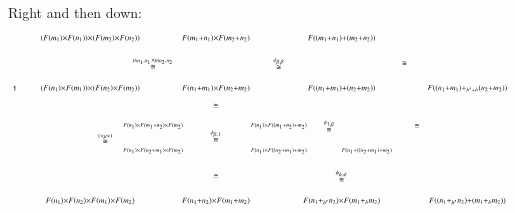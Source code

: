 \documentclass[reqno]{amsart}
\begin{document}
Right and then down:
\[
\begin{tikzpicture}[scale=1.6]
\node () at (5.75,2.25) {$\scriptstyle\stackrel{\mu_{m_1,n_1} \times \mu_{m_2,n_2}}{\cong}$};
\node () at (8.25,2.25) {$\scriptstyle\stackrel{\phi_{\beta,\beta}}{\cong}$};
\node () at (10.75,2.25) {$\scriptstyle{\cong}$};
\node () at (4.8,0.75) {$\scriptstyle\stackrel{1 \times \mu \times 1}{\cong}$};
\node () at (7,1.4) {$\scriptstyle{\cong}$};
\node () at (7,0.8) {$\scriptstyle\stackrel{\phi_{\beta,1}}{\cong}$};
\node () at (7,0) {$\scriptstyle{\cong}$};
\node () at (9.5,0) {$\scriptstyle\stackrel{\phi_{\psi,\psi}}{\cong}$};
\node () at (9.25,1) {$\scriptstyle\stackrel{\phi_{1,\beta}}{\cong}$};
\node () at (11,1) {$\scriptstyle{\cong}$};
\node (D) at (3,1.75) {$\scriptstyle{\one}$};
\node (E) at (7,-0.5) {$\scriptstyle{F(n_1+n_2) \times F(m_1+m_2)}$};
\node (E') at (9.5,-0.5) {$\scriptstyle{F(n_1+_{b'} n_2) \times F(m_1+_{b}m_2)}$};
\node (E'') at (12,-0.5) {$\scriptstyle{F((n_1+_{b'} n_2)+(m_1+_{b}m_2))}$};
\node (C) at (7,1.75) {$\scriptstyle{F(n_1+m_1) \times F(n_2+m_2)}$};
\node (A) at (9.5,1.75) {$\scriptstyle{F((n_1+m_1)+(n_2+m_2))}$};
\node (A') at (12,1.75) {$\scriptstyle{F((n_1+m_1)+_{b'+b} (n_2+m_2))}$};
\node (G) at (4.5,1.75) {$\scriptstyle{(F(n_1) \times F(m_1)) \times (F(n_2) \times F(m_2))}$};
\node (G') at (4.5,-0.5) {$\scriptstyle{F(n_1) \times F(n_2) \times F(m_1) \times F(m_2)}$};
\node (G'') at (4.5,2.75) {$\scriptstyle{(F(m_1) \times F(n_1)) \times (F(m_2) \times F(n_2))}$};
\node (F) at (7,2.75) {$\scriptstyle{F(m_1+n_1) \times F(m_2+n_2)}$};
\node (F') at (9.5,2.75) {$\scriptstyle{F((m_1+n_1)+(m_2+n_2))}$};
\node (B) at (5.75,1) {$\scriptscriptstyle{F(n_1) \times F(m_1+n_2) \times F(m_2)}$};
\node (B') at (8.25,1) {$\scriptscriptstyle{F(n_1) \times F((m_1+n_2)+m_2)}$};
\node (B'') at (5.75,0.5) {$\scriptscriptstyle{F(n_1) \times F(n_2+m_1) \times F(m_2)}$};
\node (B''') at (8.25,0.5) {$\scriptscriptstyle{F(n_1) \times F((n_2+m_1)+m_2)}$};
\node (H) at (10,0.5) {$\scriptscriptstyle{F(n_1+((n_2+m_1)+m_2)}$};

\end{tikzpicture}\]
\end{document}
